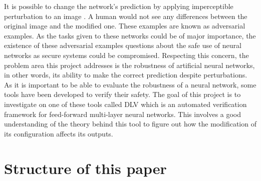 It is possible to change the network's prediction by applying imperceptible perturbation to an image \cite{Intriguing}. A human would not see any differences between the original image and the modified one. These examples are known as adversarial examples. As the tasks given to these networks could be of major importance, the existence of these adversarial examples questions about the safe use of neural networks as secure systems could be compromised. 
Respecting this concern, the problem area this project addresses is the robustness of artificial neural networks, in other words,  its ability to make the correct prediction despite perturbations. As it is important to be able to evaluate the robustness of a neural network, some tools have been developed to verify their safety. The goal of this project is to investigate on one of these tools called DLV which is an automated verification framework for feed-forward multi-layer neural networks.
This involves a good understanding of the theory behind this tool to figure out how the modification of its configuration affects its outputs.


\section{Structure of this paper}
